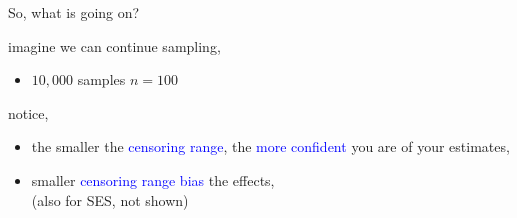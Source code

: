 \begin{lhframe}[rhgraphic={\texttt{[image: descendant7\_samplesize.pdf]}}]
	{So, what is going on?}
	
	imagine we can continue sampling,
	\begin{itemize}
		\item $10,000$ samples $n=100$
	\end{itemize}
	
	notice,
	\begin{itemize}
		\item the smaller the \textcolor{blue}{censoring range}, the \textcolor{blue}{more confident} you are of your estimates,
		\item smaller \textcolor{blue}{censoring range} \textcolor{blue}{bias} the effects, \\
		{\small (also for SES, not shown)}
	\end{itemize}
\end{lhframe}
%
%
